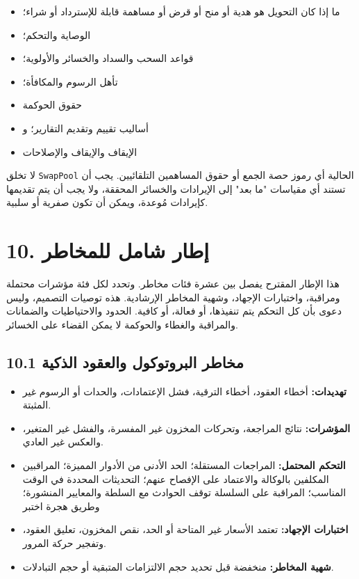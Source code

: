 \documentclass[11pt]{article}
\begin{document}
\begin{itemize}[leftmargin=*]
\item ما إذا كان التحويل هو هدية أو منح أو قرض أو مساهمة قابلة للإسترداد أو شراء؛
\item الوصاية والتحكم؛
\item قواعد السحب والسداد والخسائر والأولوية؛
\item تأهل الرسوم والمكافأة؛
\item حقوق الحوكمة
\item أساليب تقييم وتقديم التقارير؛ و
\item الإيقاف والإيقاف والإصلاحات
\end{itemize}
لا تخلق \texttt{SwapPool} الحالية أي رموز حصة الجمع أو حقوق المساهمين التلقائيين. يجب أن تستند أي مقياسات "ما بعد" إلى الإيرادات والخسائر المحققة، ولا يجب أن يتم تقديمها كإيرادات مُوعدة، ويمكن أن تكون صفرية أو سلبية.


\section*{10. إطار شامل للمخاطر}

هذا الإطار المقترح يفصل بين عشرة فئات مخاطر. وتحدد لكل فئة مؤشرات محتملة ومراقبة، واختبارات الإجهاد، وشهية المخاطر الإرشادية. هذه توصيات التصميم، وليس دعوى بأن كل التحكم يتم تنفيذها، أو فعالة، أو كافية. الحدود والاحتياطيات والضمانات والمراقبة والغطاء والحوكمة لا يمكن القضاء على الخسائر.

\subsection*{10.1 مخاطر البروتوكول والعقود الذكية}

\begin{itemize}[leftmargin=*]
\item \textbf{تهديدات:} أخطاء العقود، أخطاء الترقية، فشل الإعتمادات، والحدات أو الرسوم غير المثبتة.
\item \textbf{المؤشرات:} نتائج المراجعة، وتحركات المخزون غير المفسرة، والفشل غير المتغير، والعكس غير العادي.
\item \textbf{التحكم المحتمل:} المراجعات المستقلة؛ الحد الأدنى من الأدوار المميزة؛ المراقبين المكلفين بالوكالة والاعتماد على الإفصاح عنهم؛ التحديثات المحددة في الوقت المناسب؛ المراقبة على السلسلة توقف الحوادث مع السلطة والمعايير المنشورة؛ وطريق هجرة اختبر
\item \textbf{اختبارات الإجهاد:} تعتمد الأسعار غير المتاحة أو الحد، نقص المخزون، تعليق العقود، وتفجير حركة المرور.
\item \textbf{شهية المخاطر:} منخفضة قبل تحديد حجم الالتزامات المتبقية أو حجم التبادلات.
\end{itemize}
\end{document}
